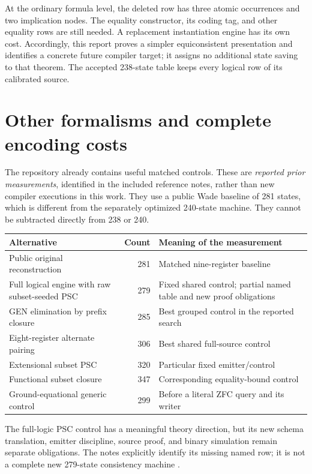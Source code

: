 At the ordinary formula level, the deleted row has three
atomic occurrences and two implication nodes. The equality
constructor, its coding tag, and other equality rows are
still needed. A replacement instantiation engine has its
own cost. Accordingly, this report proves a simpler
equiconsistent presentation and identifies a concrete
future compiler target; it assigns no additional state
saving to that theorem. The accepted 238-state table keeps
every logical row of its calibrated source.

\section{Other formalisms and complete encoding costs}
\label{sec:costs}

The repository already contains useful matched controls.
These are \emph{reported prior measurements}, identified
in the included reference notes, rather than new compiler
executions in this work. They use a public Wade baseline of
281 states, which is different from the separately optimized
240-state machine. They cannot be subtracted directly from
238 or 240.

\begin{center}
\small
\begin{tabular}{@{}L{0.34\textwidth}rL{0.43\textwidth}@{}}
\toprule
Alternative & Count & Meaning of the measurement\\
\midrule
Public original reconstruction & 281 & Matched nine-register baseline\\
Full logical engine with raw subset-seeded PSC & 279 & Fixed shared control; partial named table and new proof obligations\\
GEN elimination by prefix closure & 285 & Best grouped control in the reported search\\
Eight-register alternate pairing & 306 & Best shared full-source control\\
Extensional subset PSC & 320 & Particular fixed emitter/control\\
Functional subset closure & 347 & Corresponding equality-bound control\\
Ground-equational generic control & 299 & Before a literal ZFC query and its writer\\
\bottomrule
\end{tabular}
\end{center}

The full-logic PSC control has a meaningful theory direction,
but its new schema translation, emitter discipline, source
proof, and binary simulation remain separate obligations.
The notes explicitly identify its missing named row;
it is not a complete new 279-state consistency machine
\cite{controls}.

